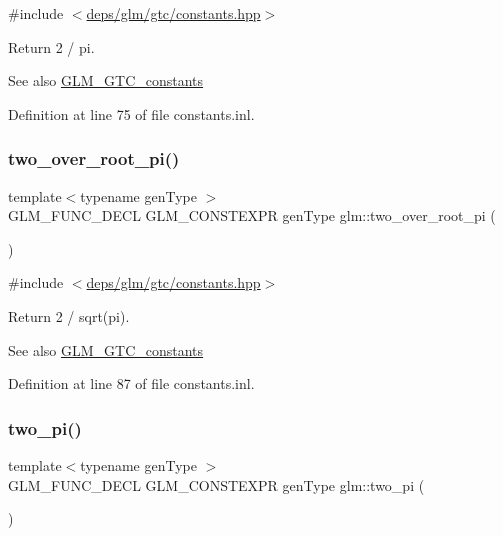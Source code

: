 {\ttfamily \#include $<$\hyperlink{constants_8hpp}{deps/glm/gtc/constants.\+hpp}$>$}

Return 2 / pi. \begin{DoxySeeAlso}{See also}
\hyperlink{group__gtc__constants}{G\+L\+M\+\_\+\+G\+T\+C\+\_\+constants} 
\end{DoxySeeAlso}


Definition at line 75 of file constants.\+inl.

\mbox{\label{group__gtc__constants_ga5827301817640843cf02026a8d493894}} 
\subsubsection{\texorpdfstring{two\+\_\+over\+\_\+root\+\_\+pi()}{two\_over\_root\_pi()}}
{\footnotesize\ttfamily template$<$typename gen\+Type $>$ \\
G\+L\+M\+\_\+\+F\+U\+N\+C\+\_\+\+D\+E\+CL G\+L\+M\+\_\+\+C\+O\+N\+S\+T\+E\+X\+PR gen\+Type glm\+::two\+\_\+over\+\_\+root\+\_\+pi (\begin{DoxyParamCaption}{ }\end{DoxyParamCaption})}



{\ttfamily \#include $<$\hyperlink{constants_8hpp}{deps/glm/gtc/constants.\+hpp}$>$}

Return 2 / sqrt(pi). \begin{DoxySeeAlso}{See also}
\hyperlink{group__gtc__constants}{G\+L\+M\+\_\+\+G\+T\+C\+\_\+constants} 
\end{DoxySeeAlso}


Definition at line 87 of file constants.\+inl.

\mbox{\label{group__gtc__constants_gaa5276a4617566abcfe49286f40e3a256}} 
\subsubsection{\texorpdfstring{two\+\_\+pi()}{two\_pi()}}
{\footnotesize\ttfamily template$<$typename gen\+Type $>$ \\
G\+L\+M\+\_\+\+F\+U\+N\+C\+\_\+\+D\+E\+CL G\+L\+M\+\_\+\+C\+O\+N\+S\+T\+E\+X\+PR gen\+Type glm\+::two\+\_\+pi (\begin{DoxyParamCaption}{ }\end{DoxyParamCaption})}



